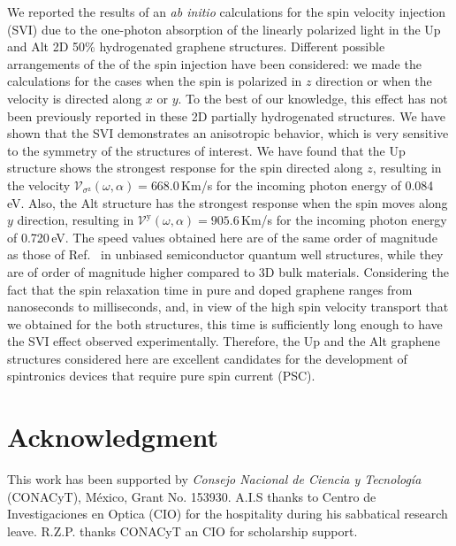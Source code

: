 \documentclass[floatfix,prb,aps,superscriptaddress,showpacs,11pt,preprint,letterpaper]{revtex4}
\begin{document}
We reported the results of an \emph{ab initio} calculations for the spin
velocity injection (SVI) due to the one-photon absorption of the linearly
polarized light in the Up and Alt 2D 50\% hydrogenated graphene structures.
Different possible arrangements of the of the spin injection have been
considered: we made the calculations for the cases when the spin is polarized
in $z$ direction or when the velocity is directed along $x$ or $y$. To the best
of our knowledge, this effect has not been previously reported in these 2D
partially hydrogenated structures. We have shown that the  SVI demonstrates an
anisotropic behavior, which is very sensitive to the symmetry of the structures
of interest. We have found that the Up structure shows the strongest response
for the spin directed along $z$, resulting in the velocity
$\mathcal{V}_{\sigma^{\mathrm{z}}} (\omega,\alpha) = 668.0$\,Km/s for the
incoming photon energy of 0.084\,eV. Also, the Alt structure has the strongest
response when the spin moves along $y$ direction, resulting in
$\mathcal{V}^{\mathrm{y}} (\omega,\alpha) = 905.6$\,Km/s for the incoming
photon energy of 0.720\,eV. The speed values obtained here are of the same
order of magnitude as those of Ref.~ in unbiased
semiconductor quantum well structures, while they are of order of magnitude
higher compared to 3D bulk materials. Considering the fact that the spin
relaxation time in pure and doped graphene ranges from nanoseconds to
milliseconds, \cite{wojtaszekPRB13,ertlerPRB09} and, in view of the high spin
velocity transport that we obtained for the both structures, this time is
sufficiently long enough to have the SVI effect observed experimentally.
Therefore, the Up and the Alt graphene structures considered here are
excellent candidates for the development of spintronics devices that require
pure spin current (PSC).

\section{Acknowledgment}
This work has been supported by \emph{Consejo Nacional de Ciencia y
Tecnolog\'ia} (CONACyT), M\'exico, Grant No. 153930.
A.I.S thanks to Centro de Investigaciones en Optica (CIO) for the hospitality 
during his sabbatical research leave.
R.Z.P. thanks CONACyT an CIO for scholarship support.


\end{document}
